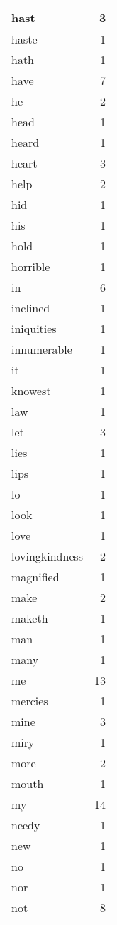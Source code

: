 \begin{center}
\begin{longtable}{l|r}
hast & 3 \\ \hline
haste & 1 \\ \hline
hath & 1 \\ \hline
have & 7 \\ \hline
he & 2 \\ \hline
head & 1 \\ \hline
heard & 1 \\ \hline
heart & 3 \\ \hline
help & 2 \\ \hline
hid & 1 \\ \hline
his & 1 \\ \hline
hold & 1 \\ \hline
horrible & 1 \\ \hline
in & 6 \\ \hline
inclined & 1 \\ \hline
iniquities & 1 \\ \hline
innumerable & 1 \\ \hline
it & 1 \\ \hline
knowest & 1 \\ \hline
law & 1 \\ \hline
let & 3 \\ \hline
lies & 1 \\ \hline
lips & 1 \\ \hline
lo & 1 \\ \hline
look & 1 \\ \hline
love & 1 \\ \hline
lovingkindness & 2 \\ \hline
magnified & 1 \\ \hline
make & 2 \\ \hline
maketh & 1 \\ \hline
man & 1 \\ \hline
many & 1 \\ \hline
me & 13 \\ \hline
mercies & 1 \\ \hline
mine & 3 \\ \hline
miry & 1 \\ \hline
more & 2 \\ \hline
mouth & 1 \\ \hline
my & 14 \\ \hline
needy & 1 \\ \hline
new & 1 \\ \hline
no & 1 \\ \hline
nor & 1 \\ \hline
not & 8 \\ \hline

\end{longtable}
\end{center}
